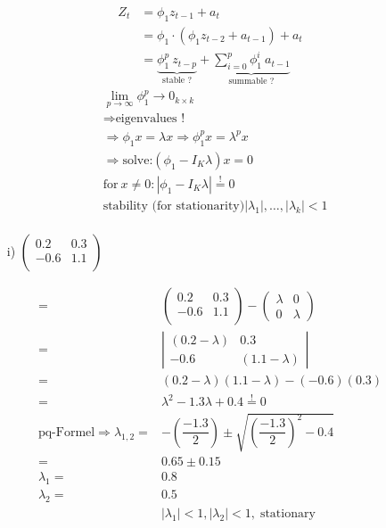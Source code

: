 \documentclass[12pt,a4paper]{article}
\begin{document}
\begin{align*}
  Z_t & = \phi_1 z_{t-1} + a_t\\
  & = \phi_1 \cdot(\phi_1 z_{t-2} + a_{t-1}) + a_t \\
    & = \underbrace{ \phi_1^p \ z_{t-p}}_{\text{stable ?}} + \underbrace{\sum_{i = 0}^{p} \phi_1^{i} \ a_{t -1} }_{\text{summable ?}}
\end{align*} \begin{align*}
  & \lim_{p \rightarrow \infty} \phi_1^p \longrightarrow 0_{k \times k} \\
  & \Rightarrow \text{eigenvalues !} \\
  & \Rightarrow \phi_1 x = \lambda x \Rightarrow \phi_1^{p} x = \lambda^p x\\
  & \Rightarrow \text{solve:} \left( \phi_1 - I_K \lambda \right) x = 0\\
  & \text{for} \ x \neq 0: \left| \phi_1 - I_K \lambda \right| \overset{!}{=} 0 \\
  & \text{stability (for stationarity)}  \left| \lambda_1 \right|, \ldots,  \left| \lambda_k \right| < 1 \\
\end{align*}

\begin{itemize} 
    \item[i)] $\begin{pmatrix}
        0.2 & 0.3 \\ 
        -0.6 & 1.1 \\
      \end{pmatrix} $
\end{itemize}

\begin{align*}
   = & \begin{pmatrix}
        0.2 & 0.3 \\ 
        -0.6 & 1.1 \\
      \end{pmatrix} - 
      \begin{pmatrix}
       \lambda & 0 \\ 
       0 & \lambda
      \end{pmatrix}\\
      = &  
      \left|
      \begin{matrix}
      (0.2 - \lambda) & 0.3 \\ 
        -0.6 & (1.1 - \lambda)
      \end{matrix}
      \right| \\
      = & (0.2 -\lambda)(1.1 - \lambda) - (-0.6) (0.3)\\
      = & \lambda^2 - 1.3 \lambda + 0.4 \overset{!}{=} 0 \\
      \text{pq-Formel} \Rightarrow  \lambda_{1,2} = & - \left( \dfrac{-1.3}{2} \right) \pm \sqrt{ \left( \dfrac{-1.3}{2} \right)^2 - 0.4 }\\
       = & 0.65 \pm 0.15 \\
      \lambda_1 = & 0.8 \\
      \lambda_2 = & 0.5 \\
      & |\lambda_1| < 1 , |\lambda_2| < 1,  \; \text{stationary}
\end{align*}
\end{document}
